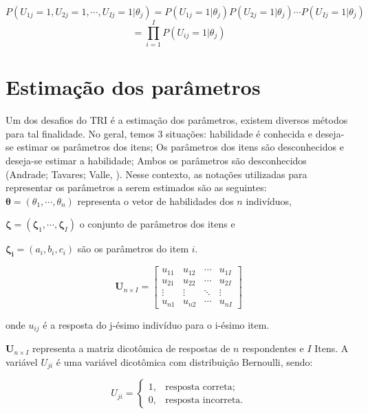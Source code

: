 \[
 P(U_{1j} = 1, U_{2j} = 1, \cdots, U_{Ij} = 1 |\theta_j) = 
 P(U_{1j} = 1|\theta_j)  P(U_{2j} = 1|\theta_j) \cdots P(U_{Ij} = 1|\theta_j) 
\] 
\[
 = \prod_{i=1}^{I}P(U_{ij} = 1|\theta_j) 
\]


\section{Estimação dos parâmetros}

Um dos desafios do TRI é a estimação dos parâmetros, existem diversos métodos para tal finalidade. No geral, temos 3 situações:  habilidade é conhecida e deseja-se estimar os parâmetros dos itens; Os parâmetros dos itens são desconhecidos e deseja-se estimar a habilidade; Ambos os parâmetros são desconhecidos (Andrade; Tavares; Valle, \citeyear{de2000teoria}).  Nesse contexto, as notações utilizadas para representar os parâmetros a serem estimados são as seguintes:\\


\noindent $ \boldsymbol{\theta} = (\theta_1, \cdots, \theta_n) $  representa o vetor de habilidades dos $n$ indivíduos,

\noindent $ \boldsymbol{\zeta} = (\boldsymbol{\zeta}_1, \cdots, \boldsymbol{\zeta}_I) $ o conjunto de parâmetros dos itens e

\noindent $ \boldsymbol{\zeta_i} = (a_i, b_i, c_i) $ são os parâmetros do item $i$.

\[ \textbf{U}_{n\times I} =  
\begin{bmatrix}
	u_{11} & u_{12} & \cdots & u_{1I} \\
	u_{21} & u_{22} & \cdots & u_{2I} \\
	\vdots & \vdots & \ddots & \vdots\\
	u_{n1} & u_{n2} & \cdots & u_{nI}
\end{bmatrix}
\]

\noindent onde $u_{ij}$ é a resposta do j-ésimo indivíduo para o i-ésimo item.

\noindent $\textbf{U}_{n\times I}$ representa a matriz dicotômica de respostas de $ n $ respondentes e $ I $ Itens. A variável $U_{ji}$ é uma variável dicotômica com distribuição Bernoulli, sendo:

\[U_{ji} =    \begin{cases}
	
	  1, & \mbox{resposta correta;}  \\
	
	  0, & \mbox{resposta incorreta.}
	
\end{cases}
\]

